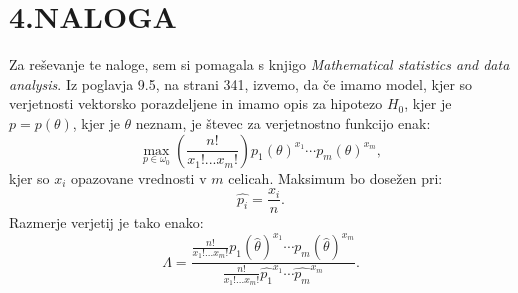 \documentclass{article}
\begin{document}
\section*{4.NALOGA}
Za reševanje te naloge, sem si pomagala s knjigo \textit{Mathematical statistics and data analysis}. Iz poglavja 9.5, na strani 341, izvemo, da če imamo model, kjer so verjetnosti vektorsko porazdeljene in imamo opis za hipotezo $H_0$, kjer je $p = p(\theta)$, kjer je $\theta$ neznam, je števec za verjetnostno funkcijo enak:
\begin{equation*}
\max_{p\in \omega_0} \left(  \frac{n!}{x_1!...x_m!} \right) p_1(\theta)^{x_1} \cdots p_m(\theta)^{x_m},
\end{equation*}
kjer so $x_i$ opazovane vrednosti v $m$ celicah.
Maksimum bo dosežen pri:
\begin{equation*}
\hat{p_i} =  \frac{x_i}{n}.
\end{equation*}
Razmerje verjetij je tako enako:
\begin{equation*}
\Lambda= \frac{\frac{n!}{x_1!...x_m!}  p_1(\hat{\theta})^{x_1} \cdots p_m(\hat{\theta})^{x_m}}{\frac{n!}{x_1!...x_m!}  \hat{p_1}^{x_1} \cdots \hat{p_m}^{x_m}}.
\end{equation*}
\end{document}
